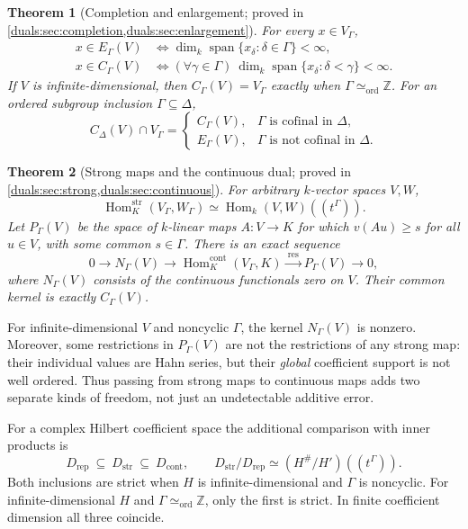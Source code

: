 \documentclass[11pt,letterpaper]{article}
\numberwithin{equation}{section}
\newtheorem{theorem}{Theorem}[section]
\theoremstyle{definition}
\theoremstyle{remark}
\newcommand{\Z}{\mathbb Z}
\newcommand{\Span}{\operatorname{span}}
\newcommand{\Hom}{\operatorname{Hom}}
\newcommand{\res}{\operatorname{res}}
\newcommand{\Dstr}{D_{\mathrm{str}}}
\newcommand{\Dcont}{D_{\mathrm{cont}}}
\newcommand{\Drep}{D_{\mathrm{rep}}}
\newcommand{\cyc}{\Gamma\simeq_{\mathrm{ord}}\Z}
\begin{document}
\begin{theorem}[Completion and enlargement; proved in
\cref{duals:sec:completion,duals:sec:enlargement}]\label{duals:thm:overview-completion}
For every $x\in V_\Gamma$,
\begin{align}
 x\in E_\Gamma(V)
 &\iff \dim_k\Span\{x_\delta:\delta\in\Gamma\}<\infty,\label{duals:eq:overview-E}\\
 x\in C_\Gamma(V)
 &\iff (\forall\gamma\in\Gamma)\ 
 \dim_k\Span\{x_\delta:\delta<\gamma\}<\infty.\label{duals:eq:overview-C}
\end{align}
If $V$ is infinite-dimensional, then
$C_\Gamma(V)=V_\Gamma$ exactly when $\cyc$.
For an ordered subgroup inclusion $\Gamma\subseteq\Delta$,
\[
 C_\Delta(V)\cap V_\Gamma=
 \begin{cases}
 C_\Gamma(V),&\Gamma\text{ is cofinal in }\Delta,\\
 E_\Gamma(V),&\Gamma\text{ is not cofinal in }\Delta.
 \end{cases}
\]
\end{theorem}

\begin{theorem}[Strong maps and the continuous dual; proved in
\cref{duals:sec:strong,duals:sec:continuous}]\label{duals:thm:overview-duals}
For arbitrary $k$-vector spaces $V,W$,
\[
 \Hom_K^{\mathrm{str}}(V_\Gamma,W_\Gamma)
 \simeq \Hom_k(V,W)((t^\Gamma)).
\]
Let $P_\Gamma(V)$ be the space of $k$-linear maps $A:V\to K$ for which
$v(Au)\ge s$ for all $u\in V$, with some common $s\in\Gamma$.
There is an exact sequence
\[
 0\longrightarrow N_\Gamma(V)\longrightarrow
 \Hom_K^{\mathrm{cont}}(V_\Gamma,K)
 \xrightarrow{\ \res\ } P_\Gamma(V)\longrightarrow0,
\]
where $N_\Gamma(V)$ consists of the continuous functionals zero on $V$.
Their common kernel is exactly $C_\Gamma(V)$.
\end{theorem}

For infinite-dimensional $V$ and noncyclic $\Gamma$, the kernel
$N_\Gamma(V)$ is nonzero. Moreover, some restrictions in $P_\Gamma(V)$
are not the restrictions of any strong map: their individual values are
Hahn series, but their \emph{global} coefficient support is not well
ordered. Thus passing from strong maps to continuous maps adds two
separate kinds of freedom, not just an undetectable additive error.

For a complex Hilbert coefficient space the additional comparison with
inner products is
\begin{equation}\label{duals:eq:overview-three}
 \Drep\ \subseteq\ \Dstr\ \subseteq\ \Dcont,
 \qquad
 \Dstr/\Drep\simeq (H^\#/H')((t^\Gamma)).
\end{equation}
Both inclusions are strict when $H$ is infinite-dimensional and
$\Gamma$ is noncyclic. For infinite-dimensional $H$ and
$\Gamma\simeq_{\mathrm{ord}}\Z$, only the first is strict. In finite coefficient dimension all three coincide.
\end{document}
